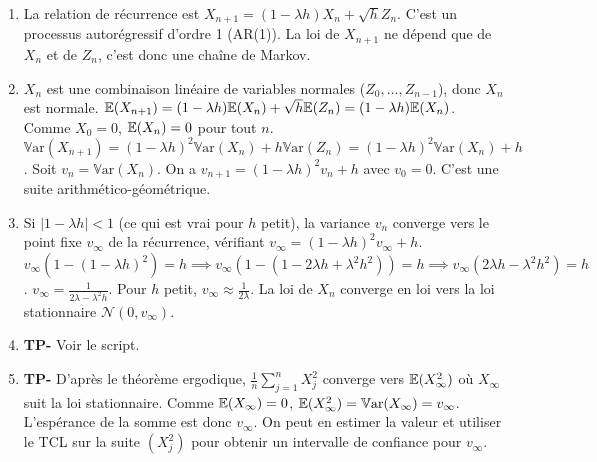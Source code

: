 \documentclass[solutions]{exercices}
\begin{document}
\begin{solution}
	\begin{enumerate}
		\item La relation de récurrence est $X_{n+1} = (1-\lambda h)X_n + \sqrt{h}Z_n$. C'est un processus autorégressif d'ordre 1 (AR(1)). La loi de $X_{n+1}$ ne dépend que de $X_n$ et de $Z_n$, c'est donc une chaîne de Markov.
		\item $X_n$ est une combinaison linéaire de variables normales ($Z_0, \dots, Z_{n-1}$), donc $X_n$ est normale.
		      $\mathbb{E}(X_{n+1}) = (1-\lambda h)\mathbb{E}(X_n) + \sqrt{h}\mathbb{E}(Z_n) = (1-\lambda h)\mathbb{E}(X_n)$. Comme $X_0=0$, $\mathbb{E}(X_n)=0$ pour tout $n$.
		      $\mathbb{V}\mathrm{ar}(X_{n+1}) = (1-\lambda h)^2 \mathbb{V}\mathrm{ar}(X_n) + h \mathbb{V}\mathrm{ar}(Z_n) = (1-\lambda h)^2 \mathbb{V}\mathrm{ar}(X_n) + h$.
		      Soit $v_n = \mathbb{V}\mathrm{ar}(X_n)$. On a $v_{n+1} = (1-\lambda h)^2 v_n + h$ avec $v_0=0$. C'est une suite arithmético-géométrique.
		\item Si $|1-\lambda h|<1$ (ce qui est vrai pour $h$ petit), la variance $v_n$ converge vers le point fixe $v_\infty$ de la récurrence, vérifiant $v_\infty = (1-\lambda h)^2 v_\infty + h$.
		      $v_\infty(1-(1-\lambda h)^2) = h \implies v_\infty(1 - (1-2\lambda h + \lambda^2h^2)) = h \implies v_\infty(2\lambda h - \lambda^2h^2) = h$.
		      $v_\infty = \frac{1}{2\lambda - \lambda^2h}$. Pour $h$ petit, $v_\infty \approx \frac{1}{2\lambda}$.
		      La loi de $X_n$ converge en loi vers la loi stationnaire $\mathcal{N}(0, v_\infty)$.
		\item \textbf{TP-} Voir le script.
		\item \textbf{TP-} D'après le théorème ergodique, $\frac{1}{n} \sum_{j=1}^n X_j^2$ converge vers $\mathbb{E}(X_\infty^2)$ où $X_\infty$ suit la loi stationnaire. Comme $\mathbb{E}(X_\infty)=0$, $\mathbb{E}(X_\infty^2) = \mathbb{V}\mathrm{ar}(X_\infty) = v_\infty$. L'espérance de la somme est donc $v_\infty$. On peut en estimer la valeur et utiliser le TCL sur la suite $(X_j^2)$ pour obtenir un intervalle de confiance pour $v_\infty$.
	\end{enumerate}
\end{solution}
\end{document}
